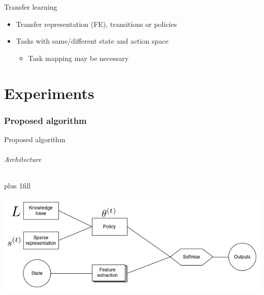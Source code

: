 \begin{frame}[fragile]{Transfer learning}
{\begin{itemize}
        \begin{itemize}
            \item Jumpstart, Asymptotic, Total reward, Time until threshold
        \end{itemize}
        \item Transfer representation (FE), transitions or policies
        \item Tasks with same/different state and action space
        \begin{itemize}
            \item Task mapping may be necessary
        \end{itemize}
    \end{itemize}
}
\end{frame}

\part{Experiments}
\section{Proposed algorithm}
\begin{frame}[fragile]{Proposed algorithm}
\framesubtitle{Architecture}
\vskip0pt plus 1fill
\begin{center}
    \includegraphics[width=\linewidth]{knowledge_transfer.png}
\end{center}
\end{frame}


